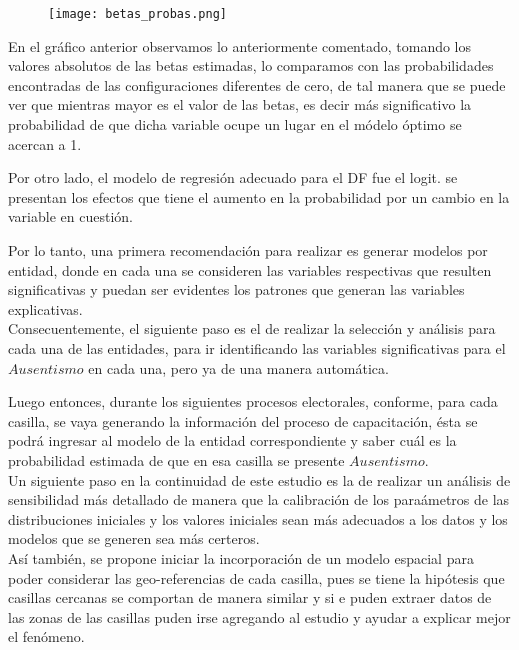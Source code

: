 \documentclass[DIV=calc, 
					paper=letter, 
					fontsize=11pt, 
					twocolumn]{scrartcl}
\begin{document}
\begin{figure}[H]
\caption{}
\centering
\texttt{[image: betas\_probas.png]}
\end{figure}

En el gr\'afico anterior observamos lo anteriormente comentado, tomando los valores absolutos de las betas estimadas, lo comparamos con las probabilidades encontradas de las configuraciones diferentes de cero, de tal manera que se puede ver que mientras mayor es el valor de las betas, es decir m\'as significativo la probabilidad de que dicha variable ocupe un lugar en el m\'odelo \'optimo se acercan a 1.

Por otro lado, el modelo de regresi\'on adecuado para el DF fue el logit. se presentan los efectos que tiene el aumento en la probabilidad por un cambio en la variable en cuesti\'on.

Por lo tanto, una primera recomendaci\'on para realizar es generar modelos por entidad, donde en cada una se consideren las variables respectivas que resulten significativas y puedan ser evidentes los patrones que generan las variables explicativas.\\

Consecuentemente, el siguiente paso es el de realizar la selecci\'on y an\'alisis para cada una de las entidades, para ir identificando las variables significativas para el $Ausentismo$ en cada una, pero ya de una manera autom\'atica.

Luego entonces, durante los siguientes procesos electorales, conforme, para cada casilla, se vaya generando la informaci\'on del proceso de capacitaci\'on, \'esta se podr\'a ingresar al modelo de la entidad correspondiente y saber cu\'al es la probabilidad estimada de que en esa casilla se presente $Ausentismo$.\\

Un siguiente paso en la continuidad de este estudio es la de realizar un an\'alisis de sensibilidad m\'as detallado de manera que la calibraci\'on de los para\'ametros de las distribuciones iniciales y los valores iniciales sean m\'as adecuados a los datos y los modelos que se generen sea m\'as certeros.\\ 

Así tambi\'en, se propone iniciar la incorporaci\'on de un modelo espacial para poder considerar las geo-referencias de cada casilla, pues se tiene la hip\'otesis que casillas cercanas se comportan de manera similar y si e puden extraer datos de las zonas de las casillas puden irse agregando al estudio y ayudar a explicar mejor el fen\'omeno.\\
\end{document}
